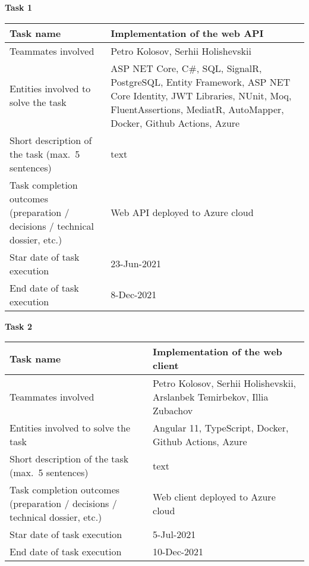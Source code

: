 \textbf{Task 1}\\[2mm]
\begin{tabular}{|p{}|p{}|}
    \hline
    Task name                                                                    & Implementation of the web API      \\
    \hline
    Teammates involved                                                           & Petro Kolosov, Serhii Holishevskii \\
    \hline
    Entities involved to solve the task & ASP NET Core, C\#, SQL, SignalR, PostgreSQL,
    Entity Framework, ASP NET Core Identity,
    JWT Libraries, NUnit, Moq, FluentAssertions, MediatR, AutoMapper, Docker, Github Actions, Azure \\
    \hline
    Short description of the task (max.\ 5 sentences)                            & text                               \\
    \hline
    Task completion outcomes (preparation / decisions / technical dossier, etc.) & Web API deployed to Azure cloud    \\
    \hline
    Star date of task execution                                                  & 23-Jun-2021                        \\
    \hline
    End date of task execution                                                   & 8-Dec-2021                         \\
    \hline
\end{tabular}
\vskip 5mm
\hspace*{-6mm}\textbf{Task 2}\\[2mm]
\begin{tabular}{|p{}|p{}|}
    \hline
    Task name                                                                    & Implementation of the web client                                         \\
    \hline
    Teammates involved                                                           & Petro Kolosov, Serhii Holishevskii, Arslanbek Temirbekov, Illia Zubachov \\
    \hline
    Entities involved to solve the task                                          & Angular 11, TypeScript, Docker, Github Actions, Azure                    \\
    \hline
    Short description of the task (max.\ 5 sentences)                            & text                               \\
    \hline
    Task completion outcomes (preparation / decisions / technical dossier, etc.) & Web client deployed to Azure cloud                                       \\
    \hline
    Star date of task execution                                                  & 5-Jul-2021                                                               \\
    \hline
    End date of task execution                                                   & 10-Dec-2021                                                              \\
    \hline
\end{tabular}
